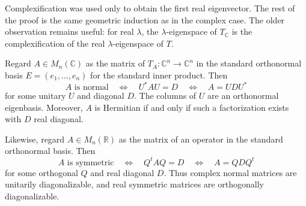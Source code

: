 Complexification was used only to obtain the first real eigenvector.  The rest
of the proof is the same geometric induction as in the complex case.  The
older observation remains useful: for real \(\lambda\), the
\(\lambda\)-eigenspace of \(T_{\mathbb C}\) is the complexification of the
real \(\lambda\)-eigenspace of \(T\).

\begin{corollary}
\label{cor:matrix-spectral-theorem}
Regard \(A\in M_n(\mathbb C)\) as the matrix of
\(T_A:\mathbb C^n\to\mathbb C^n\) in the standard orthonormal basis
\(E=(e_1,\ldots,e_n)\) for the standard inner product.  Then
\[
A\text{ is normal}
\quad\Longleftrightarrow\quad
U^*AU=D
\quad\Longleftrightarrow\quad
A=UDU^*
\]
for some unitary \(U\) and diagonal \(D\). The columns of \(U\) are an
orthonormal eigenbasis. Moreover, \(A\) is Hermitian if and only if such a
factorization exists with \(D\) real diagonal.

Likewise, regard \(A\in M_n(\mathbb R)\) as the matrix of an operator in the
standard orthonormal basis.  Then
\[
A\text{ is symmetric}
\quad\Longleftrightarrow\quad
Q^tAQ=D
\quad\Longleftrightarrow\quad
A=QDQ^t
\]
for some orthogonal \(Q\) and real diagonal \(D\). Thus complex normal
matrices are unitarily diagonalizable, and real symmetric matrices are
orthogonally diagonalizable.
\end{corollary}
